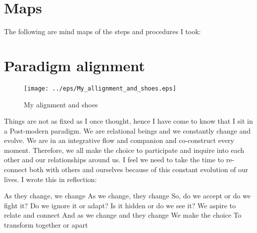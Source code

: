 \section {Maps}
The following are mind maps of the steps and procedures I took:



\section{Paradigm alignment}


\begin{figure}[h!] 
\begin{center}
\texttt{[image: ../eps/My\_allignment\_and\_shoes.eps]}
\caption{My alignment and shoes}
\label{label}
\end{center}
\end{figure}




Things are not as fixed as I once thought, hence I have come to know that I sit in a Post-modern paradigm. We are relational beings and we constantly change and evolve. We are in an integrative flow and companion and co-construct every moment. Therefore, we all make the choice to participate and inquire into each other and our relationships around us. I feel we need to take the time to re-connect both with others and ourselves because of this constant evolution of our lives. I wrote this in reflection:


\begin {centering}As they change, we change\newline 
As we change, they change\newline 
So, do we accept or do we fight it?\newline 
Do we ignore it or adapt?\newline 
Is it hidden or do we see it?\newline 
We aspire to relate and connect\newline 
And as we change and they change\newline 
We make the choice\newline 
To transform together or apart\newline 
\end {centering} 








